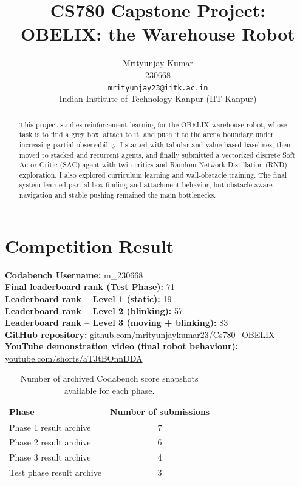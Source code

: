 \documentclass[11pt,oneside]{article}
\title{CS780 Capstone Project:\\OBELIX: the Warehouse Robot}
\author{
    Mrityunjay Kumar\\
    230668\\
    {\tt mrityunjay23@iitk.ac.in}\\
    {Indian Institute of Technology Kanpur (IIT Kanpur)}
}
\date{}
\begin{document}
\maketitle

\begin{abstract}
This project studies reinforcement learning for the OBELIX warehouse robot, whose task is to find a grey box, attach to it, and push it to the arena boundary under increasing partial observability. I started with tabular and value-based baselines, then moved to stacked and recurrent agents, and finally submitted a vectorized discrete Soft Actor-Critic (SAC) agent with twin critics and Random Network Distillation (RND) exploration. I also explored curriculum learning and wall-obstacle training. The final system learned partial box-finding and attachment behavior, but obstacle-aware navigation and stable pushing remained the main bottlenecks.
\end{abstract}

\section{Competition Result}
\textbf{Codabench Username:} m\_230668\\
\textbf{Final leaderboard rank (Test Phase):} 71\\
\textbf{Leaderboard rank -- Level 1 (static):} 19\\
\textbf{Leaderboard rank -- Level 2 (blinking):}  57\\
\textbf{Leaderboard rank -- Level 3 (moving + blinking):} 83\\
\textbf{GitHub repository:} \href{https://github.com/mrityunjaykumar23/Cs780_OBELIX}{github.com/mrityunjaykumar23/Cs780\_OBELIX}\\
\textbf{YouTube demonstration video (final robot behaviour):} \href{https://youtube.com/shorts/aTJtBOnnDDA?feature=share}{youtube.com/shorts/aTJtBOnnDDA}

\begin{table}[h]
\centering
\caption{Number of archived Codabench score snapshots available for each phase.}
\begin{tabular}{lc}
\toprule
Phase & Number of submissions \\
\midrule
Phase 1 result archive & 7 \\
Phase 2 result archive & 6 \\
Phase 3 result archive & 4 \\
Test phase result archive & 3 \\
\bottomrule
\end{tabular}
\end{table}
\end{document}
